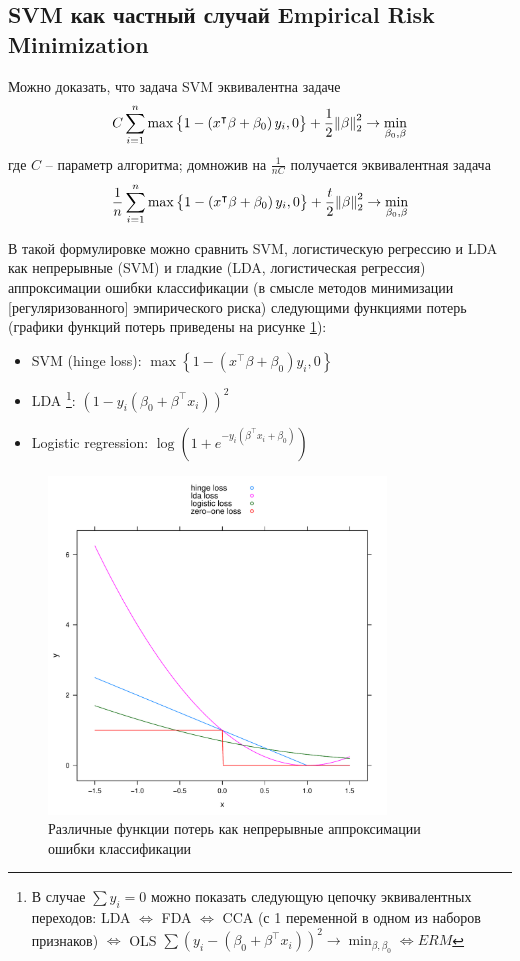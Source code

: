 \documentclass[11pt, a4paper]{article}\usepackage[]{graphicx}\usepackage[]{color}
\begin{document}
\subsection{SVM как частный случай Empirical Risk Minimization}
Можно доказать, что задача SVM эквивалентна задаче 
\[
	C\sum\limits_{i=1}^{n}\max\left\{1-\left(x^\intercal\beta+\beta_0\right)y_i,0\right\}+\frac{1}{2}\norm{\beta}_2^2\rightarrow\min\limits_{\beta_0,\beta}
\]
где $C$ -- параметр алгоритма; домножив на $\frac{1}{nC}$ получается эквивалентная задача
\[
	\frac{1}{n}\sum\limits_{i=1}^{n}\max\left\{1-\left(x^\intercal\beta+\beta_0\right)y_i,0\right\}+\frac{t}{2}\norm{\beta}_2^2\rightarrow\min\limits_{\beta_0,\beta}
\]

В такой формулировке можно сравнить SVM, логистическую регрессию и LDA как непрерывные (SVM) и гладкие (LDA, логистическая регрессия)
аппроксимации ошибки классификации (в смысле методов минимизации [регуляризованного] эмпирического риска) следующими функциями потерь (графики функций
потерь приведены на рисунке \ref{fig:erm}):
\begin{itemize}
	\item SVM (hinge loss): $\max\left\{1-\left(x^\intercal\beta+\beta_0\right)y_i, 0\right\}$
	\item LDA%
		\footnote{В случае $\sum y_i=0$ можно показать следующую цепочку эквивалентных переходов: LDA $\Leftrightarrow$ FDA $\Leftrightarrow$ CCA (с 1 переменной в одном из наборов признаков) $\Leftrightarrow$ OLS $\sum\left(y_i-\left(\beta_0+\beta^\intercal x_i\right)\right)^2\rightarrow\min_{\beta,\beta_0}\Leftrightarrow ERM$}:
		$\left(1-y_i\left(\beta_0+\beta^\intercal x_i\right)\right)^2$
	\item Logistic regression: $\log\left(1+e^{-y_i\left(\beta^\intercal x_i+\beta_0\right)}\right)$
\end{itemize}

\begin{figure}
	\centering
	\includegraphics[width=0.8\textwidth]{loss.pdf}
	\caption{Различные функции потерь как непрерывные аппроксимации ошибки классификации\label{fig:erm}}
\end{figure}
\end{document}
